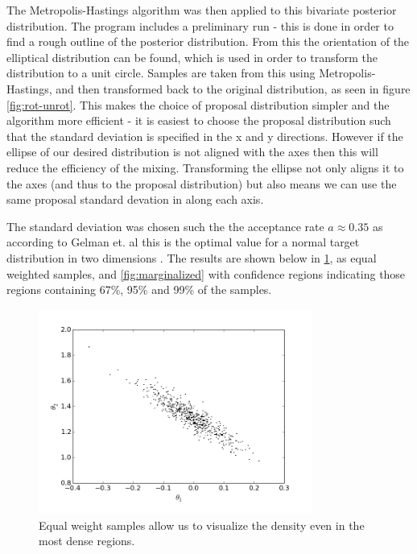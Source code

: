 \documentclass[a4paper,11pt,twoside]{article}
\begin{document}
The Metropolis-Hastings algorithm was then applied to this bivariate posterior
distribution. The program includes a preliminary run - this is done in order
to find a rough outline of the posterior distribution. From this the
orientation of the elliptical distribution can be found, which is used in order
to transform the distribution to a unit circle. Samples are taken from this
using Metropolis-Hastings, and then transformed back to the original
distribution, as seen in figure \ref{fig:rot-unrot}. 
This makes the choice of proposal distribution simpler and the
algorithm more efficient - it is easiest to choose the proposal distribution
such that the standard deviation is specified in the x and y directions.
However if the ellipse of our desired distribution is not aligned with the axes
then this will reduce the efficiency of the mixing. Transforming the ellipse
not only aligns it to the axes (and thus to the proposal distribution) but also
means we can use the same proposal standard devation in along each axis.

The standard deviation was chosen such the the acceptance rate $a \approx 0.35$
as according to Gelman et. al this is the optimal value for a
normal target distribution in two dimensions \cite{acceptance}.
The results are shown below in \cref{fig:equalweight}, as equal weighted
samples, and \cref{fig:marginalized} with confidence regions indicating those
regions containing 67\%, 95\% and 99\% of the samples.

\begin{figure}[htb]
	\centering
	\includegraphics[width=0.8\textwidth]{equalweight.png}
	\caption{Equal weight samples allow us to visualize the density even in the most dense regions.}
	\label{fig:equalweight}
\end{figure}
\end{document}
